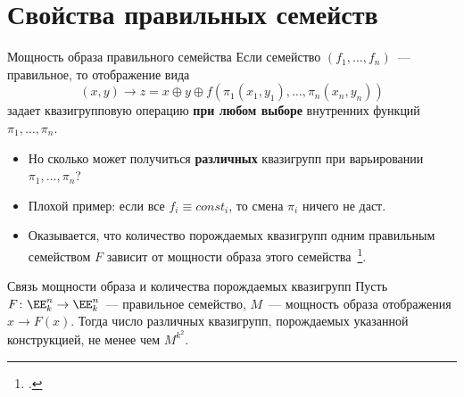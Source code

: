 \section{Свойства правильных семейств}


\begin{frame}{Мощность образа правильного семейства}
    Если семейство $(f_1, \ldots, f_n)$~--- правильное, то отображение вида 
    \[
        (x, y) \to z = x \oplus y \oplus f(\pi_1(x_1, y_1), \ldots, \pi_n(x_n, y_n))
    \]
    задает квазигрупповую операцию \textbf{при любом выборе} внутренних функций $\pi_1, \ldots, \pi_n$.
    \pause 
    \begin{itemize}
        \item Но сколько может получиться \textbf{различных} квазигрупп при варьировании $\pi_1, \ldots, \pi_n$?
        \pause 
        \item Плохой пример: если все $f_i \equiv const_i$, то смена $\pi_i$ ничего не даст.
        \pause
        \item Оказывается, что количество порождаемых квазигрупп одним правильным семейством $F$ зависит от мощности образа этого семейства~\footcite{galatenko23}.
    \end{itemize}
    \begin{exampleblock}{Связь мощности образа и количества порождаемых квазигрупп}
        Пусть $F \colon \EE_k^n \to \EE_k^n$~--- правильное семейство, $M$~--- мощность образа отображения $x \to F(x)$.
        Тогда число различных квазигрупп, порождаемых указанной конструкцией, не менее чем $M^{k^2}$.
    \end{exampleblock}
\end{frame}



